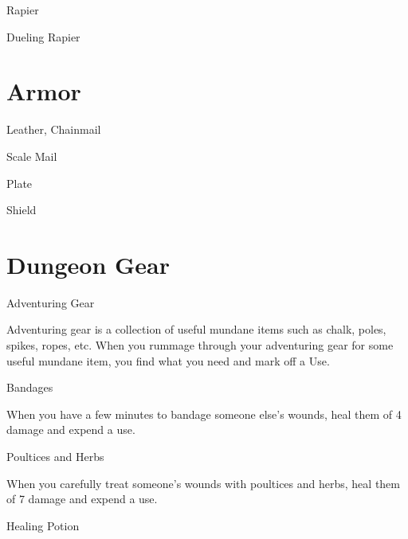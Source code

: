        

Rapier	 

       

Dueling Rapier	 

       
\section{Armor}   
       

Leather, Chainmail	 

       

Scale Mail	 

       

Plate	 

       

Shield	 

       
\section{Dungeon Gear}    
       

Adventuring Gear	 

       

Adventuring gear is a collection of useful mundane items such as chalk, poles, spikes, ropes, etc. When you rummage through your adventuring gear for some useful mundane item, you find what you need and mark off a Use.

       

Bandages	 

       

When you have a few minutes to bandage someone else's wounds, heal them of 4 damage and expend a use.

       

Poultices and Herbs	 

       

When you carefully treat someone's wounds with poultices and herbs, heal them of 7 damage and expend a use.

       

Healing Potion	 

